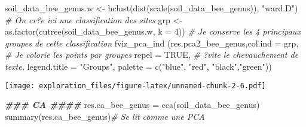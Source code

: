 \documentclass[
]{article}
\newenvironment{Shaded}{\begin{snugshade}}{\end{snugshade}}
\newcommand{\AttributeTok}[1]{\textcolor[rgb]{0.77,0.63,0.00}{#1}}
\newcommand{\CommentTok}[1]{\textcolor[rgb]{0.56,0.35,0.01}{\textit{#1}}}
\newcommand{\ConstantTok}[1]{\textcolor[rgb]{0.00,0.00,0.00}{#1}}
\newcommand{\DecValTok}[1]{\textcolor[rgb]{0.00,0.00,0.81}{#1}}
\newcommand{\DocumentationTok}[1]{\textcolor[rgb]{0.56,0.35,0.01}{\textbf{\textit{#1}}}}
\newcommand{\FunctionTok}[1]{\textcolor[rgb]{0.00,0.00,0.00}{#1}}
\newcommand{\NormalTok}[1]{#1}
\newcommand{\OtherTok}[1]{\textcolor[rgb]{0.56,0.35,0.01}{#1}}
\newcommand{\StringTok}[1]{\textcolor[rgb]{0.31,0.60,0.02}{#1}}
\begin{document}
\begin{Shaded}
\begin{Highlighting}[]
\NormalTok{soil\_data\_bee\_genus.w }\OtherTok{\textless{}{-}} \FunctionTok{hclust}\NormalTok{(}\FunctionTok{dist}\NormalTok{(}\FunctionTok{scale}\NormalTok{(soil\_data\_bee\_genus)), }\StringTok{"ward.D"}\NormalTok{) }\CommentTok{\# On cr?e ici une classification des sites}
\NormalTok{grp }\OtherTok{\textless{}{-}} \FunctionTok{as.factor}\NormalTok{(}\FunctionTok{cutree}\NormalTok{(soil\_data\_bee\_genus.w, }\AttributeTok{k =} \DecValTok{4}\NormalTok{)) }\CommentTok{\# Je conserve les 4 principaux groupes de cette classification}
\FunctionTok{fviz\_pca\_ind}\NormalTok{ (res.pca2\_bee\_genus,}\AttributeTok{col.ind =}\NormalTok{ grp, }\CommentTok{\# Je colorie les points par groupes}
              \AttributeTok{repel =} \ConstantTok{TRUE}\NormalTok{, }\CommentTok{\# ?vite le chevauchement de texte,}
              \AttributeTok{legend.title =} \StringTok{"Groups"}\NormalTok{,}
              \AttributeTok{palette =} \FunctionTok{c}\NormalTok{(}\StringTok{"blue"}\NormalTok{, }\StringTok{"red"}\NormalTok{, }\StringTok{"black"}\NormalTok{,}\StringTok{"green"}\NormalTok{))}
\end{Highlighting}
\end{Shaded}

\texttt{[image: exploration\_files/figure-latex/unnamed-chunk-2-6.pdf]}

\begin{Shaded}
\begin{Highlighting}[]
\DocumentationTok{\#\#\# CA \#\#\#\#}
\NormalTok{res.ca\_bee\_genus }\OtherTok{=} \FunctionTok{cca}\NormalTok{(soil\_data\_bee\_genus)}
\FunctionTok{summary}\NormalTok{(res.ca\_bee\_genus)}\CommentTok{\# Se lit comme une PCA}
\end{Highlighting}
\end{Shaded}
\end{document}
